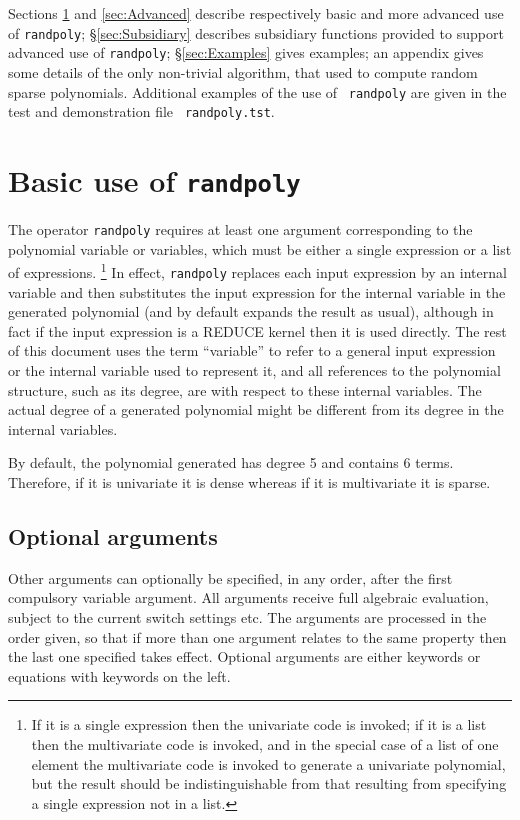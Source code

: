 Sections \ref{sec:Basic} and \ref{sec:Advanced} describe respectively
basic and more advanced use of {\tt randpoly}; \S\ref{sec:Subsidiary}
describes subsidiary functions provided to support advanced use of
{\tt randpoly}; \S\ref{sec:Examples} gives examples; an appendix gives
some details of the only non-trivial algorithm, that used to compute
random sparse polynomials.  Additional examples of the use of {\tt
randpoly} are given in the test and demonstration file {\tt
randpoly.tst}.


\section{Basic use of {\tt randpoly}}
\label{sec:Basic}

The operator {\tt randpoly} requires at least one argument
corresponding to the polynomial variable or variables, which must be
either a single expression or a list of expressions.%
\footnote{If it is a single expression then the univariate code is
invoked; if it is a list then the multivariate code is invoked, and in
the special case of a list of one element the multivariate code is
invoked to generate a univariate polynomial, but the result should be
indistinguishable from that resulting from specifying a single
expression not in a list.} %
In effect, {\tt randpoly} replaces each input expression by an
internal variable and then substitutes the input expression for the
internal variable in the generated polynomial (and by default expands
the result as usual), although in fact if the input expression is a
REDUCE kernel then it is used directly.  The rest of this document
uses the term ``variable'' to refer to a general input expression or
the internal variable used to represent it, and all references to the
polynomial structure, such as its degree, are with respect to these
internal variables.  The actual degree of a generated polynomial might
be different from its degree in the internal variables.

By default, the polynomial generated has degree 5 and contains 6
terms.  Therefore, if it is univariate it is dense whereas if it is
multivariate it is sparse.


\subsection{Optional arguments}

Other arguments can optionally be specified, in any order, after the
first compulsory variable argument.  All arguments receive full
algebraic evaluation, subject to the current switch settings etc.  The
arguments are processed in the order given, so that if more than one
argument relates to the same property then the last one specified
takes effect.  Optional arguments are either keywords or equations
with keywords on the left.

